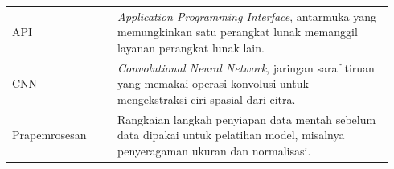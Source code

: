 %


\begin{longtable}{@{}p{0.26\linewidth}p{0.68\linewidth}@{}}
API & \textit{Application Programming Interface}, antarmuka yang memungkinkan satu perangkat lunak memanggil layanan perangkat lunak lain. \\
CNN & \textit{Convolutional Neural Network}, jaringan saraf tiruan yang memakai operasi konvolusi untuk mengekstraksi ciri spasial dari citra. \\
Prapemrosesan & Rangkaian langkah penyiapan data mentah sebelum data dipakai untuk pelatihan model, misalnya penyeragaman ukuran dan normalisasi. \\
\end{longtable}
